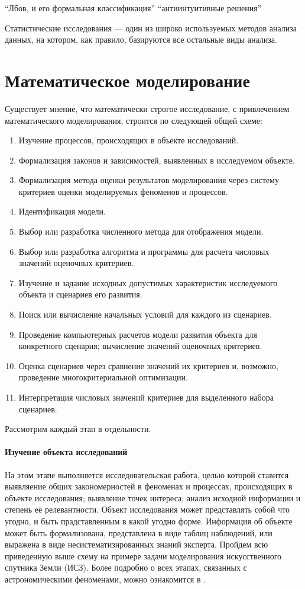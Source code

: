 \documentclass[12pt, openany, twoside]{book} %
\begin{document}
``Лбов, и его формальная классификация''
``антиинтуитивные решения''

Статистические исследования --– один из широко используемых методов анализа данных, на котором, как правило, базируются все остальные виды анализа.
\section{Математическое моделирование}

Существует мнение, что математически строгое исследование, с привлечением математического моделирования, строится по следующей общей схеме:
\begin{enumerate}
\item Изучение процессов, происходящих в объекте исследований.
\item Формализация законов и зависимостей, выявленных в исследуемом объекте.
\item Формализация метода оценки результатов моделирования через систему критериев оценки моделируемых феноменов и процессов.
\item Идентификация модели.
\item Выбор или разработка численного метода для отображения модели.
\item Выбор или разработка алгоритма и программы для расчета числовых значений оценочных критериев.
\item Изучение и задание исходных допустимых характеристик исследуемого объекта и сценариев его развития.
\item Поиск или вычисление начальных условий для каждого из сценариев.
\item Проведение компьютерных расчетов модели развития объекта для конкретного сценария; вычисление значений оценочных критериев.
\item Оценка сценариев через сравнение значений их критериев и, возможно, проведение многокритериальной оптимизации.
\item Интерпретация числовых значений критериев для выделенного набора сценариев.
\end{enumerate}

Рассмотрим каждый этап в отдельности.

\paragraph{Изучение объекта исследований} На этом этапе выполняется исследовательская работа, целью которой ставится выявляение общих закономерностей в феноменах и процессах, происходящих в объекте исследования; выявление точек интереса; анализ исходной информации и степень её релевантности. Объект исследования может представлять собой что угодно, и быть прадставленным в какой угодно форме. Информация об объекте может быть формализована, представлена в виде таблиц наблюдений, или выражена в виде несистематизированных знаний эксперта. Пройдем всю приведенную выше схему на примере задачи моделирования искусственного спутника Земли (ИСЗ). Более подробно о всех этапах, связанных с астрономическими феноменами, можно ознакомится в \cite{avanta}.
\end{document}
